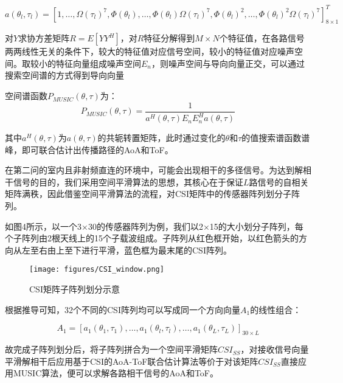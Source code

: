 \documentclass[withoutpreface,bwprint]{cumcmthesis}
\begin{document}
\begin{equation}
    a(\theta_{l},\tau_{l})=[1,\dots,\Omega(\tau_{l})^{7},\Phi(\theta_{l}),\dots,\Phi(\theta_{l})\Omega(\tau_{l})^{7},\Phi(\theta_{l})^2,\dots,\Phi(\theta_{l})^2\Omega(\tau_{l})^{7}]^{T}_{8\times1}
\end{equation}

对$Y$求协方差矩阵$R=E[YY^H]$，对$R$特征分解得到$M×N$个特征值，在各路信号两两线性无关的条件下，较大的特征值对应信号空间，较小的特征值对应噪声空间。取较小的特征向量组成噪声空间$E_{n}$，则噪声空间与导向向量正交，可以通过搜索空间谱的方式得到导向向量

空间谱函数$P_{MUSIC}(\theta,\tau)$为：
\begin{equation}
    P_{MUSIC}(\theta,\tau)=\frac{1}{a^H(\theta,\tau)E_{n}E_{n}^Ha(\theta,\tau)}
\end{equation}

其中$a^H(\theta,\tau)$为$a(\theta,\tau)$的共轭转置矩阵，此时通过变化的$\theta$和$\tau$的值搜索谱函数谱峰，即可联合估计出传播路径的AoA和ToF。

在第二问的室内且非射频直连的环境中，可能会出现相干的多径信号。为达到解相干信号的目的，我们采用空间平滑算法的思想，其核心在于保证$L$路信号的自相关矩阵满秩，因此借鉴空间平滑算法的流程，对CSI矩阵中的传感器阵列划分子阵列。

如图4所示，以一个3×30的传感器阵列为例，我们以2×15的大小划分子阵列，每个子阵列由2根天线上的15个子载波组成。子阵列从红色框开始，以红色箭头的方向从左至右由上至下进行平滑，蓝色框为最末尾的CSI阵列。
\begin{figure}[h]
\caption{CSI矩阵子阵列划分示意} \label{fig:aa}
\centering
\texttt{[image: figures/CSI\_window.png]}
\end{figure}
根据推导可知，32个不同的CSI阵列均可以写成同一个方向向量$A_1$的线性组合：

\begin{equation}
    A_{1}=[a_{1}(\theta_1,\tau_1),\dots,a_{1}(\theta_l,\tau_l),\dots,a_{1}(\theta_L,\tau_L)]_{30\times L}
\end{equation}

故完成子阵列划分后，将子阵列拼合为一个空间平滑矩阵$CSI_{SS}$，对接收信号向量平滑解相干后应用基于CSI的AoA-ToF联合估计算法等价于对该矩阵$CSI_{SS}$直接应用MUSIC算法，便可以求解各路相干信号的AoA和ToF。
\end{document}
